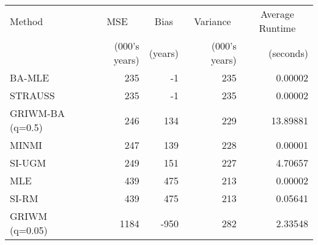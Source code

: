 
\begin{tabular}{lrrrr}
\toprule
\multicolumn{1}{l}{Method} & \multicolumn{1}{c}{MSE} & \multicolumn{1}{c}{Bias} & \multicolumn{1}{c}{Variance} & \multicolumn{1}{c}{Average Runtime} \\
 & (000's years) & (years) & (000's years) & (seconds)\\
\midrule
BA-MLE & 235 & -1 & 235 & 0.00002\\
STRAUSS & 235 & -1 & 235 & 0.00002\\
GRIWM-BA (q=0.5) & 246 & 134 & 229 & 13.89881\\
MINMI & 247 & 139 & 228 & 0.00001\\
SI-UGM & 249 & 151 & 227 & 4.70657\\
\addlinespace
MLE & 439 & 475 & 213 & 0.00002\\
SI-RM & 439 & 475 & 213 & 0.05641\\
GRIWM (q=0.05) & 1184 & -950 & 282 & 2.33548\\
\bottomrule
\end{tabular}
